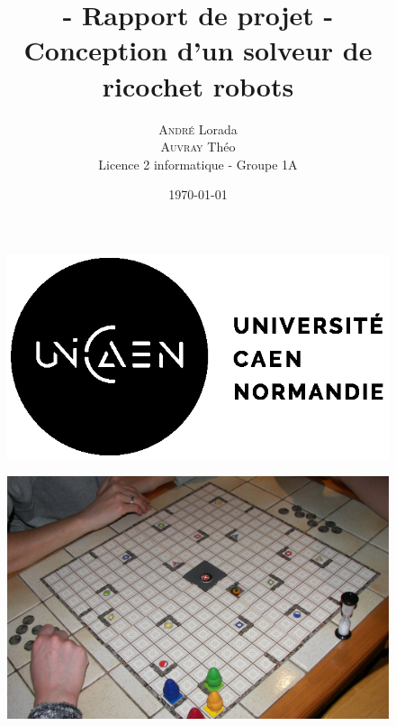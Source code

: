 \documentclass[a4paper, 12pt]{article}
\title{- Rapport de projet - \\ Conception d'un solveur de ricochet robots}
\author{
    \textsc{André} Lorada \\ 
    \textsc{Auvray} Théo \\ 
    Licence 2 informatique - Groupe 1A
}
\date \today
\begin{document}
\begin{figure}[t]
    \includegraphics[scale=1]{images/logo.png}
\end{figure}

\maketitle

\begin{figure}[H]
    \centering
    \includegraphics[scale=0.5]{images/ricochetrobot.jpg}
\end{figure}

\newpage %

\tableofcontents

\newpage %
\end{document}
